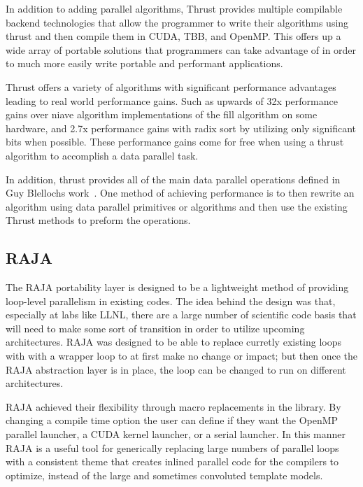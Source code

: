 In addition to adding parallel algorithms, Thrust provides multiple compilable backend technologies that allow the programmer to write their algorithms using thrust and then compile them in CUDA, TBB, and OpenMP.
%
This offers up a wide array of portable solutions that programmers can take advantage of in order to much more easily write portable and performant applications.
\cite{thrust}

Thrust offers a variety of algorithms with significant performance advantages leading to real world performance gains.
%
Such as upwards of 32x performance gains over niave algorithm implementations of the fill algorithm on some hardware, and 2.7x performance gains with radix sort by utilizing only significant bits when possible.
%
These performance gains come for free when using a thrust algorithm to accomplish a data parallel task.
%
~\cite{bell2011thrust}

In addition, thrust provides all of the main data parallel operations defined in Guy Blellochs work~\cite{blelloch1990vector}.
%
One method of achieving performance is to then rewrite an algorithm using data parallel primitives or algorithms and then use the existing Thrust methods to preform the operations.

\subsection*{\textbf{RAJA}}

The RAJA portability layer is designed to be a lightweight method of providing loop-level parallelism in existing codes.
%
The idea behind the design was that, especially at labs like LLNL, there are a large number of scientific code basis that will need to make some sort of transition in order to utilize upcoming architectures.
%
RAJA was designed to be able to replace curretly existing loops with with a wrapper loop to at first make no change or impact; but then
%
once the RAJA abstraction layer is in place, the loop can be changed to run on different architectures.
%
\cite{hornung2014raja}
\cite{hornung2016raja}

RAJA achieved their flexibility through macro replacements in the library.
%
By changing a compile time option the user can define if they want the OpenMP parallel launcher, a CUDA kernel launcher, or a serial launcher.
%
In this manner RAJA is a useful tool for generically replacing large numbers of parallel loops with a consistent theme that creates inlined parallel code for the compilers to optimize, instead of the large and sometimes convoluted template models.
%
\cite{hornung2014raja}
\cite{hornung2016raja}


